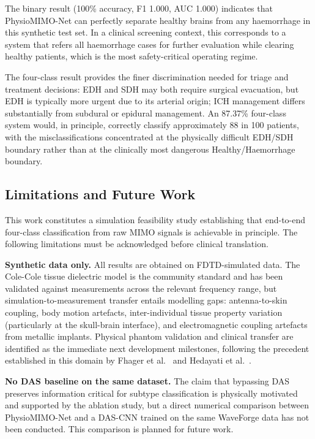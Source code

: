 \documentclass[journal]{IEEEtran}
\begin{document}
The binary result (100\% accuracy, F1 1.000, AUC 1.000)
indicates that PhysioMIMO-Net can perfectly separate healthy
brains from any haemorrhage in this synthetic test set.  In
a clinical screening context, this corresponds to a system
that refers all haemorrhage cases for further evaluation while
clearing healthy patients, which is the most safety-critical
operating regime.

The four-class result provides the finer discrimination needed
for triage and treatment decisions: EDH and SDH may both
require surgical evacuation, but EDH is typically more urgent
due to its arterial origin; ICH management differs
substantially from subdural or epidural management.  An
87.37\% four-class system would, in principle, correctly
classify approximately 88 in 100 patients, with the
misclassifications concentrated at the physically difficult
EDH/SDH boundary rather than at the clinically most dangerous
Healthy/Haemorrhage boundary.

\subsection{Limitations and Future Work}

This work constitutes a simulation feasibility study
establishing that end-to-end four-class classification from
raw MIMO signals is achievable in principle.  The following
limitations must be acknowledged before clinical translation.

\textbf{Synthetic data only.}  All results are obtained on
FDTD-simulated data.  The Cole-Cole tissue dielectric model
\cite{Gabriel1996} is the community standard and has been
validated against measurements across the relevant frequency
range, but simulation-to-measurement transfer entails
modelling gaps: antenna-to-skin coupling, body motion
artefacts, inter-individual tissue property variation
(particularly at the skull-brain interface), and
electromagnetic coupling artefacts from metallic implants.
Physical phantom validation and clinical transfer are
identified as the immediate next development milestones,
following the precedent established in this domain by
Fhager et al.\ \cite{Fhager2019} and Hedayati et al.\
\cite{Hedayati2024}.

\textbf{No DAS baseline on the same dataset.}  The claim that
bypassing DAS preserves information critical for subtype
classification is physically motivated and supported by the
ablation study, but a direct numerical comparison between
PhysioMIMO-Net and a DAS-CNN trained on the same WaveForge
data has not been conducted.  This comparison is planned for
future work.
\end{document}
